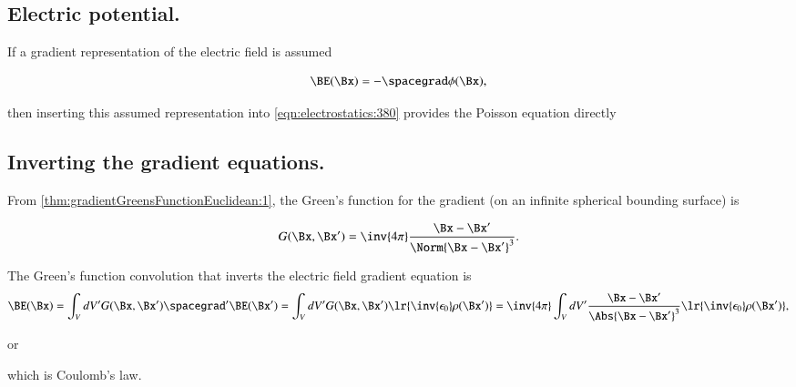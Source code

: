 \subsection{Electric potential.}

If a gradient representation of the electric field is assumed

\begin{dmath}\label{eqn:electrostatics:561}
\BE(\Bx) = -\spacegrad \phi(\Bx),
\end{dmath}

then
inserting
this assumed representation into \cref{eqn:electrostatics:380} provides the
Poisson equation directly


\subsection{Inverting the gradient equations.}

From \cref{thm:gradientGreensFunctionEuclidean:1}, the
 Green's function for the gradient (on an infinite spherical bounding surface) is

\begin{dmath}\label{eqn:electrostatics:260}
G(\Bx, \Bx') = \inv{4 \pi} \frac{\Bx - \Bx'}{\Norm{\Bx - \Bx'}^3}.
\end{dmath}

The Green's function convolution that inverts the electric field gradient equation is
\begin{dmath}\label{eqn:electrostatics:621}
\BE(\Bx)
= \int_V dV' G(\Bx, \Bx') \spacegrad' \BE(\Bx')
= \int_V dV' G(\Bx, \Bx') \lr{ \inv{\epsilon_0}\rho(\Bx') }
= \inv{4\pi} \int_V dV' \frac{\Bx - \Bx'}{ \Abs{\Bx - \Bx'}^3 } \lr{ \inv{\epsilon_0}\rho(\Bx') },
\end{dmath}

or

which is Coulomb's law.

